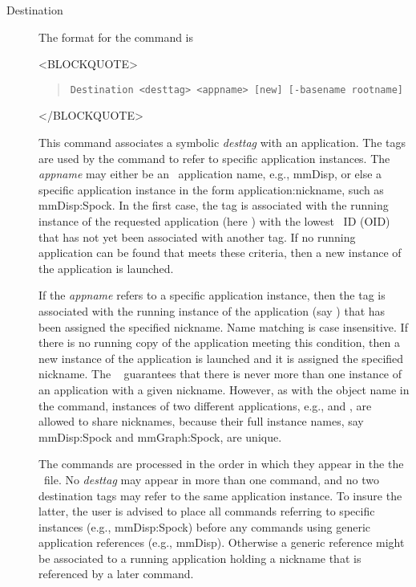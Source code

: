 \begin{description}
\item[Destination]
The format for the  command is
\begin{rawhtml}
<BLOCKQUOTE>
\end{rawhtml}
\begin{quote}
\begin{verbatim}
Destination <desttag> <appname> [new] [-basename rootname]
\end{verbatim}
\end{quote}
\begin{rawhtml}
</BLOCKQUOTE>
\end{rawhtml}
This command associates a symbolic \textit{desttag} with an
application.  The tags are used by the
 command
to refer to specific application instances.  The \textit{appname} may
either be an \OOMMF\ application name, e.g., mmDisp, or else a
specific application instance in the form application:nickname, such
as mmDisp:Spock.  In the first case, the tag is associated with the
running instance of the requested application (here ) with
the lowest \OOMMF\ ID (OID) that has not yet been associated with
another tag.  If no running application can be found that meets these
criteria, then a new instance of the application is launched.

If the \textit{appname} refers to a specific application instance, then
the tag is associated with the running instance of the application (say
) that has been assigned the specified nickname.  Name
matching is case insensitive.  If there is no running copy of the
application meeting this condition, then a new instance of the
application is launched and it is assigned the specified nickname.  The
\OOMMF\  guarantees
that there is never more than one instance of an application with a
given nickname.  However, as with the object name in the 
command, instances of two different applications, e.g.,  and
, are allowed to share nicknames, because their full
instance names, say mmDisp:Spock and mmGraph:Spock, are unique.

The  commands are processed in the order in which they
appear in the the \MIF\ file.  No \textit{desttag} may appear in more
than one  command, and no two destination tags may refer
to the same application instance.  To insure the latter, the user is
advised to place all  commands referring to specific
instances (e.g., mmDisp:Spock) before any  commands
using generic application references (e.g., mmDisp).  Otherwise a
generic reference might be associated to a running application holding a
nickname that is referenced by a later  command.


\end{description}
